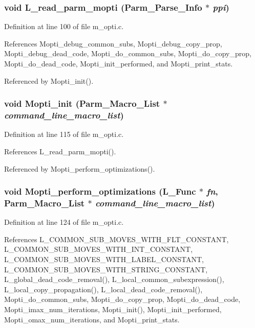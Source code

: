 \subsubsection{\setlength{\rightskip}{0pt plus 5cm}void L\_\-read\_\-parm\_\-mopti (Parm\_\-Parse\_\-Info $\ast$ {\em ppi})}\label{m__opti_8c_c4127ccba417f74a6dda847e3908e13f}




Definition at line 100 of file m\_\-opti.c.

References Mopti\_\-debug\_\-common\_\-subs, Mopti\_\-debug\_\-copy\_\-prop, Mopti\_\-debug\_\-dead\_\-code, Mopti\_\-do\_\-common\_\-subs, Mopti\_\-do\_\-copy\_\-prop, Mopti\_\-do\_\-dead\_\-code, Mopti\_\-init\_\-performed, and Mopti\_\-print\_\-stats.

Referenced by Mopti\_\-init().
\subsubsection{\setlength{\rightskip}{0pt plus 5cm}void Mopti\_\-init (Parm\_\-Macro\_\-List $\ast$ {\em command\_\-line\_\-macro\_\-list})}\label{m__opti_8c_975d37e4997b7022bc1659fc5f6aaf79}




Definition at line 115 of file m\_\-opti.c.

References L\_\-read\_\-parm\_\-mopti().

Referenced by Mopti\_\-perform\_\-optimizations().
\subsubsection{\setlength{\rightskip}{0pt plus 5cm}void Mopti\_\-perform\_\-optimizations (L\_\-Func $\ast$ {\em fn}, Parm\_\-Macro\_\-List $\ast$ {\em command\_\-line\_\-macro\_\-list})}\label{m__opti_8c_9f5474cb2be3b277262066b02350942a}




Definition at line 124 of file m\_\-opti.c.

References L\_\-COMMON\_\-SUB\_\-MOVES\_\-WITH\_\-FLT\_\-CONSTANT, L\_\-COMMON\_\-SUB\_\-MOVES\_\-WITH\_\-INT\_\-CONSTANT, L\_\-COMMON\_\-SUB\_\-MOVES\_\-WITH\_\-LABEL\_\-CONSTANT, L\_\-COMMON\_\-SUB\_\-MOVES\_\-WITH\_\-STRING\_\-CONSTANT, L\_\-global\_\-dead\_\-code\_\-removal(), L\_\-local\_\-common\_\-subexpression(), L\_\-local\_\-copy\_\-propagation(), L\_\-local\_\-dead\_\-code\_\-removal(), Mopti\_\-do\_\-common\_\-subs, Mopti\_\-do\_\-copy\_\-prop, Mopti\_\-do\_\-dead\_\-code, Mopti\_\-imax\_\-num\_\-iterations, Mopti\_\-init(), Mopti\_\-init\_\-performed, Mopti\_\-omax\_\-num\_\-iterations, and Mopti\_\-print\_\-stats.

